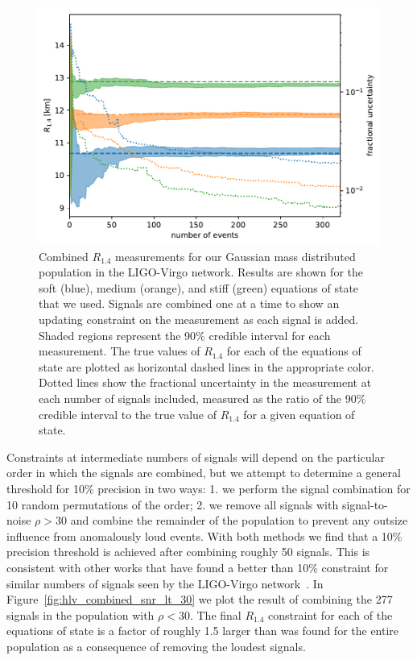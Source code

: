 \begin{figure}[ht]
\includegraphics[width=\textwidth]{Figures/eos-meas/final_pop_hlv_combined_radius_3eos_gaussian_prior_seed0_bw0p3.pdf}
\caption{Combined $R_{1.4}$ measurements for our Gaussian mass distributed population in the LIGO-Virgo network. Results are shown for the soft (blue), medium (orange), and stiff (green) equations of state that we used. Signals are combined one at a time to show an updating constraint on the measurement as each signal is added. Shaded regions represent the 90\% credible interval for each measurement. The true values of $R_{1.4}$ for each of the equations of state are plotted as horizontal dashed lines in the appropriate color. Dotted lines show the fractional uncertainty in the measurement at each number of signals included, measured as the ratio of the 90\% credible interval to the true value of $R_{1.4}$ for a given equation of state.}
\label{fig:hlv_combined}
\end{figure}

Constraints at intermediate numbers of signals will depend on the particular order in which the signals are combined, but we attempt to determine a general threshold for 10\% precision in two ways: 1. we perform the signal combination for 10 random permutations of the order; 2. we remove all signals with signal-to-noise $\rho>30$ and combine the remainder of the population to prevent any outsize influence from anomalously loud events. With both methods we find that a 10\% precision threshold is achieved after combining roughly 50 signals. This is consistent with other works that have found a better than 10\% constraint for similar numbers of signals seen by the LIGO-Virgo network~\cite{Lackey:2014fwa,Vivanco:2019qnt}. In Figure~\ref{fig:hlv_combined_snr_lt_30} we plot the result of combining the 277  signals in the population with $\rho < 30$. The final $R_{1.4}$ constraint for each of the equations of state is a factor of roughly 1.5 larger than was found for the entire population as a consequence of removing the loudest signals.

